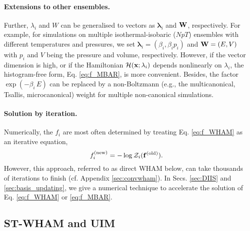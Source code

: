 \documentclass{gMOS2e}
\begin{document}
\paragraph*{
Extensions to other ensembles.}



Further,
$\lambda_i$ and $W$
can be generalised
to vectors as
$\bm{\lambda}_i$
and
$\mathbf{W}$, respectively.
%
For example,
for simulations
on multiple isothermal-isobaric ($NpT$) ensembles
with different temperatures and pressures,
%
we set
$\bm{\lambda}_i = (\beta_i, \beta_i p_i)$
and
$\mathbf{W} = (E, V)$
with
$p_i$ and $V$
being the pressure and volume,
respectively.
%
However, if the vector dimension is high,
or if the Hamiltonian $\mathcal{H}(\mathbf{x}; \lambda_i)$
depends nonlinearly on $\lambda_i$,
the histogram-free form, Eq. \eqref{eq:f_MBAR}, is more convenient\cite{
shirts2008}.
%
Besides,
the factor $\exp(-\beta_i \, E)$
can be replaced by
a non-Boltzmann
(e.g., the multicanonical\cite{
mezei1987, berg1992, lee1993},
Tsallis\cite{tsallis1988},
microcanonical\cite{
yan2003, martin-mayor2007})
weight
for multiple non-canonical simulations\cite{
kim2011}.
%



\paragraph*{
Solution by iteration.}



Numerically, the
$f_i$ are most often determined by treating Eq. \eqref{eq:f_WHAM}
as an iterative equation,
%
\begin{equation*}
f_i^\mathrm{(new)}
=
-\log \mathcal{Z}_i( \mathbf{f}^\mathrm{(old)} ).
\end{equation*}
%
However, this approach, referred to as direct WHAM below,
can take thousands of iterations to finish\cite{
bereau2009, kim2011, zhu2012}
(cf. Appendix \ref{sec:convwham}).
%
In Secs. \ref{sec:DIIS} and \ref{sec:basis_updating},
we give a numerical technique to
accelerate the solution
of Eq. \eqref{eq:f_WHAM} or \eqref{eq:f_MBAR}.





\subsection{ST-WHAM and UIM}
\end{document}
